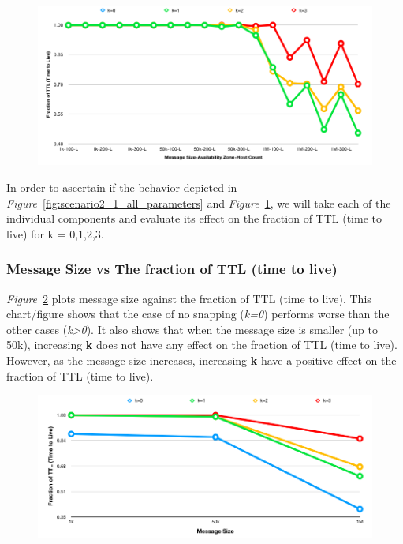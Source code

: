 {\begin{figure}[h!]
  \centering
  \includegraphics[scale=0.42]{./figures/scenario2_1_2_all_parameters}
  \label{fig:scenario2_1_2_all_parameters}
\end{figure}
\newpage
In order to ascertain if the behavior depicted in \emph{Figure}~\ref{fig:scenario2_1_all_parameters} and \emph{Figure}~\ref{fig:scenario2_1_2_all_parameters}, we will take each of the individual components and evaluate its effect on the fraction of TTL (time to live) for k = 0,1,2,3.
\subsubsection{Message Size vs The fraction of TTL (time to live)}
\emph{Figure}~\ref{fig:scenario2_2_message_size} plots message size against the fraction of TTL (time to live). This chart/figure shows that the case of no snapping (\textit{k=0}) performs worse than the other cases (\textit{k>0}). It also shows that when the message size is smaller (up to 50k), increasing \textbf{k} does not have any effect on the fraction of TTL (time to live). However, as the message size increases, increasing \textbf{k} have a positive effect on the fraction of TTL (time to live).

\begin{figure}[H]
  \centering
  \includegraphics[scale=0.4]{./figures/scenario2_2_message_size}
  \label{fig:scenario2_2_message_size}
\end{figure}

}
